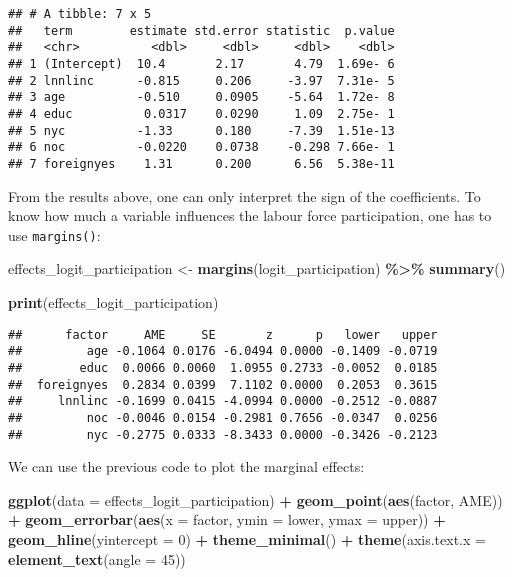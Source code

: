 \documentclass[
]{article}
\newenvironment{Shaded}{\begin{snugshade}}{\end{snugshade}}
\newcommand{\DataTypeTok}[1]{\textcolor[rgb]{0.13,0.29,0.53}{#1}}
\newcommand{\DecValTok}[1]{\textcolor[rgb]{0.00,0.00,0.81}{#1}}
\newcommand{\KeywordTok}[1]{\textcolor[rgb]{0.13,0.29,0.53}{\textbf{#1}}}
\newcommand{\NormalTok}[1]{#1}
\newcommand{\OperatorTok}[1]{\textcolor[rgb]{0.81,0.36,0.00}{\textbf{#1}}}
\newcommand{\StringTok}[1]{\textcolor[rgb]{0.31,0.60,0.02}{#1}}
\begin{document}
\begin{verbatim}
## # A tibble: 7 x 5
##   term        estimate std.error statistic  p.value
##   <chr>          <dbl>     <dbl>     <dbl>    <dbl>
## 1 (Intercept)  10.4       2.17       4.79  1.69e- 6
## 2 lnnlinc      -0.815     0.206     -3.97  7.31e- 5
## 3 age          -0.510     0.0905    -5.64  1.72e- 8
## 4 educ          0.0317    0.0290     1.09  2.75e- 1
## 5 nyc          -1.33      0.180     -7.39  1.51e-13
## 6 noc          -0.0220    0.0738    -0.298 7.66e- 1
## 7 foreignyes    1.31      0.200      6.56  5.38e-11
\end{verbatim}

From the results above, one can only interpret the sign of the coefficients. To know how much a
variable influences the labour force participation, one has to use \texttt{margins()}:

\begin{Shaded}
\begin{Highlighting}[]
\NormalTok{effects\_logit\_participation \textless{}{-}}\StringTok{ }\KeywordTok{margins}\NormalTok{(logit\_participation) }\OperatorTok{\%\textgreater{}\%}
\StringTok{  }\KeywordTok{summary}\NormalTok{()}

\KeywordTok{print}\NormalTok{(effects\_logit\_participation)}
\end{Highlighting}
\end{Shaded}

\begin{verbatim}
##      factor     AME     SE       z      p   lower   upper
##         age -0.1064 0.0176 -6.0494 0.0000 -0.1409 -0.0719
##        educ  0.0066 0.0060  1.0955 0.2733 -0.0052  0.0185
##  foreignyes  0.2834 0.0399  7.1102 0.0000  0.2053  0.3615
##     lnnlinc -0.1699 0.0415 -4.0994 0.0000 -0.2512 -0.0887
##         noc -0.0046 0.0154 -0.2981 0.7656 -0.0347  0.0256
##         nyc -0.2775 0.0333 -8.3433 0.0000 -0.3426 -0.2123
\end{verbatim}

We can use the previous code to plot the marginal effects:

\begin{Shaded}
\begin{Highlighting}[]
\KeywordTok{ggplot}\NormalTok{(}\DataTypeTok{data =}\NormalTok{ effects\_logit\_participation) }\OperatorTok{+}
\StringTok{  }\KeywordTok{geom\_point}\NormalTok{(}\KeywordTok{aes}\NormalTok{(factor, AME)) }\OperatorTok{+}
\StringTok{  }\KeywordTok{geom\_errorbar}\NormalTok{(}\KeywordTok{aes}\NormalTok{(}\DataTypeTok{x =}\NormalTok{ factor, }\DataTypeTok{ymin =}\NormalTok{ lower, }\DataTypeTok{ymax =}\NormalTok{ upper)) }\OperatorTok{+}
\StringTok{  }\KeywordTok{geom\_hline}\NormalTok{(}\DataTypeTok{yintercept =} \DecValTok{0}\NormalTok{) }\OperatorTok{+}
\StringTok{  }\KeywordTok{theme\_minimal}\NormalTok{() }\OperatorTok{+}
\StringTok{  }\KeywordTok{theme}\NormalTok{(}\DataTypeTok{axis.text.x =} \KeywordTok{element\_text}\NormalTok{(}\DataTypeTok{angle =} \DecValTok{45}\NormalTok{))}
\end{Highlighting}
\end{Shaded}
\end{document}
